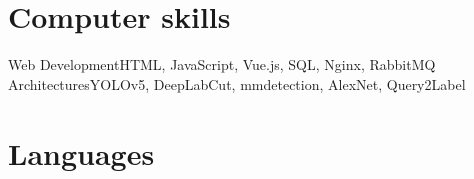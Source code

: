 \documentclass[a4paper, 10pt, final]{moderncv}
\begin{document}
\section{Computer skills}
  {Web Development}{HTML, JavaScript, Vue.js, SQL, Nginx, RabbitMQ}
  {Architectures}{YOLOv5, DeepLabCut, mmdetection, AlexNet, Query2Label}


\section{Languages}


\end{document}
